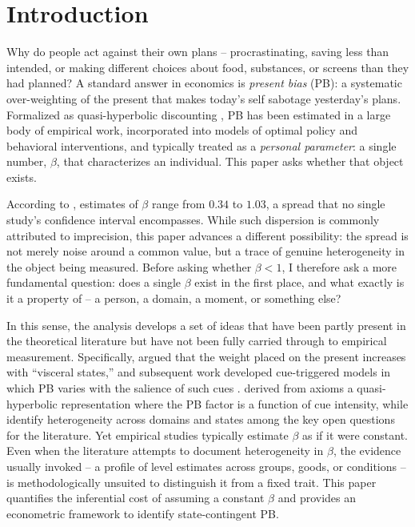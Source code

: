 \documentclass[11pt,a4paper]{article}
\theoremstyle{plain}
\theoremstyle{definition}
\begin{document}
\clearpage
\section{Introduction}
\label{sec:intro}



Why do people act against their own plans -- procrastinating, saving less than intended, %
or making different choices about food, substances, or screens than they had planned? A standard answer in economics is \emph{present bias} (PB): a systematic over-weighting of the present that makes today's self sabotage yesterday's plans. Formalized as quasi-hyperbolic discounting \citep{laibson1997,odonoghue1999}, PB has been estimated in a large body of empirical work, incorporated into models of optimal policy and behavioral interventions, and typically treated as a \emph{personal parameter}: a single number, $\beta$, that characterizes an individual. This paper asks whether that object exists.

According to \citet{lockwood2020}, estimates of $\beta$ range from $0.34$ to $1.03$, a spread that no single study's confidence interval encompasses. 
While such dispersion is commonly attributed to imprecision, this paper advances a different possibility: the spread is not merely noise around a common value, but a trace of genuine heterogeneity in the object being measured.
Before asking whether $\beta<1$, I therefore ask a more fundamental question: does a single $\beta$ exist in the first place, and what exactly is it a property of -- a person, a domain, a moment, or something else?

In this sense, the analysis develops a set of ideas that have been partly present in the theoretical literature but have not been fully carried through to empirical measurement.
Specifically, \citet{loewenstein1996} argued that the weight placed on the present increases with ``visceral states,'' and subsequent work developed cue-triggered models in which PB varies with the salience of such cues \citep{laibson2001,bernheimrangel2004}. %
\citet{pennesi2020} derived from axioms a quasi-hyperbolic representation where the PB factor is a function of cue intensity, while \citet{odonoghue2015} identify heterogeneity across domains and states among the key open questions for the literature.
Yet empirical studies typically estimate $\beta$ as if it were constant. Even when the literature attempts to document heterogeneity in $\beta$, the evidence usually invoked -- a profile of level estimates across groups, goods, or conditions %
-- is methodologically unsuited to distinguish it from a fixed trait.
This paper quantifies the inferential cost of assuming a constant $\beta$ and provides an econometric framework to identify state-contingent PB.
\end{document}
